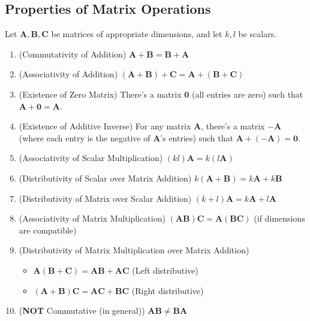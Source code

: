 \documentclass[11pt]{article}
\begin{document}
\subsection{Properties of Matrix Operations}
Let $\mathbf{A}, \mathbf{B}, \mathbf{C}$ be matrices of appropriate dimensions, and let $k, l$ be scalars.
\begin{enumerate}
    \item (Commutativity of Addition) $\mathbf{A} + \mathbf{B} = \mathbf{B} + \mathbf{A}$
    \item (Associativity of Addition) $(\mathbf{A} + \mathbf{B}) + \mathbf{C} = \mathbf{A} + (\mathbf{B} + \mathbf{C})$
    \item (Existence of Zero Matrix) There's a matrix $\mathbf{0}$ (all entries are zero) such that $\mathbf{A} + \mathbf{0} = \mathbf{A}$.
    \item (Existence of Additive Inverse) For any matrix $\mathbf{A}$, there's a matrix $-\mathbf{A}$ (where each entry is the negative of $\mathbf{A}$'s entries) such that $\mathbf{A} + (-\mathbf{A}) = \mathbf{0}$.

    \item (Associativity of Scalar Multiplication) $(kl)\mathbf{A} = k(l\mathbf{A})$
    \item (Distributivity of Scalar over Matrix Addition) $k(\mathbf{A} + \mathbf{B}) = k\mathbf{A} + k\mathbf{B}$
    \item (Distributivity of Matrix over Scalar Addition) $(k+l)\mathbf{A} = k\mathbf{A} + l\mathbf{A}$

    \item (Associativity of Matrix Multiplication) $(\mathbf{A}\mathbf{B})\mathbf{C} = \mathbf{A}(\mathbf{B}\mathbf{C})$ (if dimensions are compatible)
    \item (Distributivity of Matrix Multiplication over Matrix Addition)
        \begin{itemize}
            \item $\mathbf{A}(\mathbf{B} + \mathbf{C}) = \mathbf{A}\mathbf{B} + \mathbf{A}\mathbf{C}$ (Left distributive)
            \item $(\mathbf{A} + \mathbf{B})\mathbf{C} = \mathbf{A}\mathbf{C} + \mathbf{B}\mathbf{C}$ (Right distributive)
        \end{itemize}
    \item (\textbf{NOT} Commutative (in general)) $\mathbf{A}\mathbf{B} \neq \mathbf{B}\mathbf{A}$
\end{enumerate}
\end{document}
